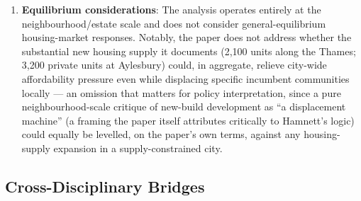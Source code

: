 \begin{enumerate}
  \item \textbf{Equilibrium considerations}: The analysis operates entirely at the neighbourhood/estate scale and does not consider general-equilibrium housing-market responses. Notably, the paper does not address whether the substantial new housing supply it documents (2,100 units along the Thames; 3,200 private units at Aylesbury) could, in aggregate, relieve city-wide affordability pressure even while displacing specific incumbent communities locally --- an omission that matters for policy interpretation, since a pure neighbourhood-scale critique of new-build development as ``a displacement machine'' (a framing the paper itself attributes critically to Hamnett's logic) could equally be levelled, on the paper's own terms, against any housing-supply expansion in a supply-constrained city.
\end{enumerate}

\subsection*{Cross-Disciplinary Bridges}

